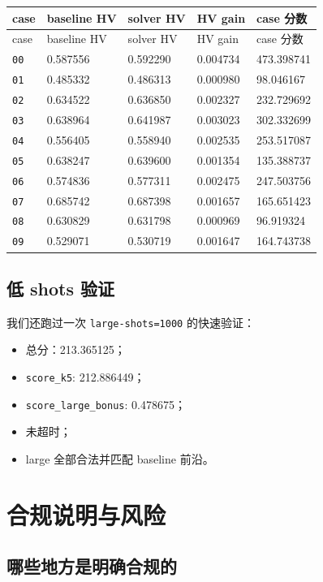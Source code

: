 \documentclass[UTF8,zihao=-4]{ctexart}
\newcommand{\code}[1]{\texttt{#1}}
\begin{document}
\begin{longtable}{lllll}
\toprule
case & baseline HV & solver HV & HV gain & case 分数 \\
\midrule
\endfirsthead
\toprule
case & baseline HV & solver HV & HV gain & case 分数 \\
\midrule
\endhead
\code{00} & 0.587556 & 0.592290 & 0.004734 & 473.398741 \\
\code{01} & 0.485332 & 0.486313 & 0.000980 & 98.046167 \\
\code{02} & 0.634522 & 0.636850 & 0.002327 & 232.729692 \\
\code{03} & 0.638964 & 0.641987 & 0.003023 & 302.332699 \\
\code{04} & 0.556405 & 0.558940 & 0.002535 & 253.517087 \\
\code{05} & 0.638247 & 0.639600 & 0.001354 & 135.388737 \\
\code{06} & 0.574836 & 0.577311 & 0.002475 & 247.503756 \\
\code{07} & 0.685742 & 0.687398 & 0.001657 & 165.651423 \\
\code{08} & 0.630829 & 0.631798 & 0.000969 & 96.919324 \\
\code{09} & 0.529071 & 0.530719 & 0.001647 & 164.743738 \\
\bottomrule
\end{longtable}

\subsection{低 shots 验证}

我们还跑过一次 \code{large-shots=1000} 的快速验证：

\begin{itemize}
  \item 总分：213.365125；
  \item \code{score\_k5}: 212.886449；
  \item \code{score\_large\_bonus}: 0.478675；
  \item 未超时；
  \item large 全部合法并匹配 baseline 前沿。
\end{itemize}

\section{合规说明与风险}

\subsection{哪些地方是明确合规的}
\end{document}
